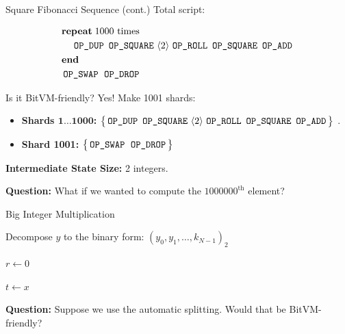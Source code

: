 \documentclass{zkdl-presentation-template}
\newcommand{\elem}[1]{\, \langle #1 \rangle \,}
\newcommand{\opcode}[1]{\, \texttt{#1} \,}
\newcommand{\script}[1]{ $\big\{ #1 \big\}$ }
\begin{document}
    \begin{frame}{Square Fibonacci Sequence (cont.)}
        Total script:
        \begin{empheqboxed}
            \small
          \begin{align*}
            &\textbf{repeat} \; \text{1000 times} \\
            & \;\;\;\; \opcode{\texttt{OP\_DUP}} \, \opcode{\texttt{OP\_SQUARE}} \elem{2} \opcode{\texttt{OP\_ROLL}} \, \opcode{\texttt{OP\_SQUARE}} \, \opcode{\texttt{OP\_ADD}} \\
            & \textbf{end} \\
            & \opcode{\texttt{OP\_SWAP}} \; \opcode{\texttt{OP\_DROP}}
          \end{align*}
        \end{empheqboxed}

        \pause Is it BitVM-friendly? Yes! Make 1001 shards:
        \begin{itemize}
            \item \textbf{Shards $\textbf{1}\dots \textbf{1000}$:} \script{\opcode{\texttt{OP\_DUP}} \, \opcode{\texttt{OP\_SQUARE}} \elem{2} \opcode{\texttt{OP\_ROLL}} \, \opcode{\texttt{OP\_SQUARE}} \, \opcode{\texttt{OP\_ADD}}}.
            \item \textbf{Shard 1001:} \script{\opcode{\texttt{OP\_SWAP}} \; \opcode{\texttt{OP\_DROP}}}
        \end{itemize}

        \pause \textbf{Intermediate State Size:} 2 integers. \pause

        \textbf{Question:} What if we wanted to compute the $1000000^{\text{th}}$ element?
    \end{frame}

    \begin{frame}{Big Integer Multiplication}
        \small
        \begin{algorithm}[H]
          \caption{Double-and-add method for integer multiplication}\label{alg:double_and_add}
          
          Decompose $y$ to the binary form: $(y_0,y_1,\dots,k_{N-1})_2$
          
          $r \gets 0$
          
          $t \gets x$
          
          
          
        \end{algorithm}
        \normalsize

        \textbf{Question:} Suppose we use the automatic splitting. Would that be BitVM-friendly?
    \end{frame}
\end{document}
